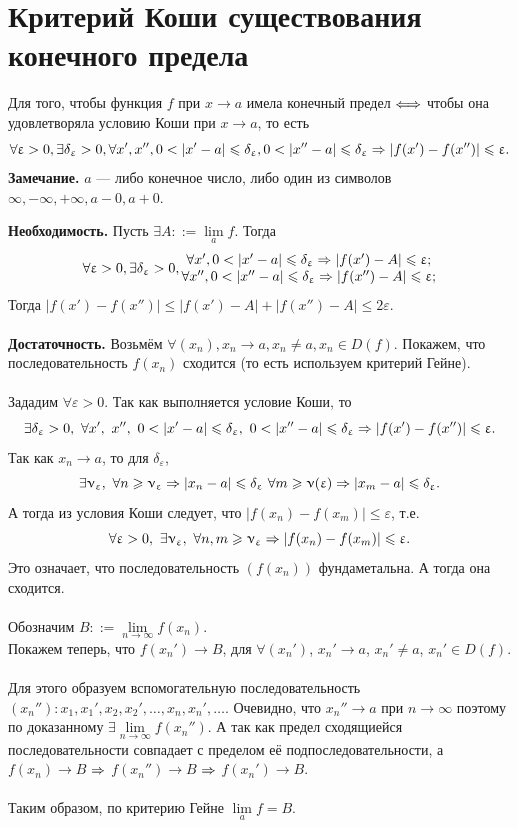 \section{Критерий Коши существования конечного предела}
\begin{theorem}
	Для того, чтобы функция $f$ при $x\to a$ имела конечный предел $\Longleftrightarrow$ чтобы она удовлетворяла условию Коши при $x\to a$, то есть
	$$\forall\varepsilon>0,\exists\delta_\varepsilon>0,\forall x', x'', 0<|x'-a|\leqslant\delta_\varepsilon, 0<|x''-a|\leqslant\delta_\varepsilon\Ra|f(x')-f(x'')|\leqslant\varepsilon.$$
	\textbf{Замечание.} $a$ --- либо конечное число, либо один из символов $\infty,-\infty,+\infty,a-0,a+0$.
\end{theorem}
\begin{Proof}\textbf{Необходимость.}
	Пусть $\exists A::=\lim\limits_a f$. Тогда\\$$\forall\varepsilon>0,\exists\delta_\varepsilon>0,\begin{matrix}
		\forall x',0<|x'-a|\leqslant\delta_\varepsilon\Ra|f(x')-A|\leqslant\varepsilon;\\
		\forall x'',0<|x''-a|\leqslant\delta_\varepsilon\Ra|f(x'')-A|\leqslant\varepsilon;
	\end{matrix}$$
	Тогда $|f(x')-f(x'')|\leqslant|f(x')-A|+|f(x'')-A|\leqslant2\varepsilon$.\\\\
	\textbf{Достаточность.}
	Возьмём $\forall(x_n),x_n\to a,x_n\neq a, x_n\in D(f)$.
	Покажем, что последовательность $f(x_n)$ сходится (то есть используем критерий Гейне).\\\\
	Зададим $\forall\varepsilon>0$. Так как выполняется условие Коши, то $$\exists\delta_\varepsilon>0,\ \forall x',\ x'',\ 0<|x'-a|\leqslant\delta_\varepsilon, \ 0<|x''-a|\leqslant\delta_\varepsilon\Ra |f(x')-f(x'')|\leqslant\varepsilon.$$
	Так как $x_n\to a$, то для $\delta_\varepsilon$, $$\exists\upnu_\upvarepsilon,\ \forall n\geqslant\upnu_\upvarepsilon\Rightarrow |x_n-a|\leqslant\delta_\upvarepsilon\ \forall m\geqslant\upnu(\upvarepsilon) \Rightarrow |x_m-a|\leqslant\delta_\upvarepsilon.$$ А тогда из условия Коши следует, что $|f(x_n)-f(x_m)|\leqslant\varepsilon$, т.е. $$\forall\varepsilon>0,\ \exists\nu_\varepsilon,\ \forall n,m\geqslant\nu_\varepsilon \Ra |f(x_n)-f(x_m)|\leqslant\varepsilon.$$	
	Это означает, что последовательность $(f(x_n))$ фундаметальна. А тогда она сходится.\\\\
	Обозначим $B::=\lim\limits_{n\to\infty}f(x_n)$.\\
	Покажем теперь, что $f(x_n')\to B$, для $\forall(x_n')$, $x_n'\to a$, $x_n'\neq a$, $x_n'\in D(f)$.\\\\
	Для этого образуем вспомогательную последовательность $(x_n''): x_1,x_1',x_2,x_2',\ldots,x_n,x_n',\ldots$. Очевидно, что $x_n''\to a$ при $n\to\infty$ поэтому по доказанному $\exists\lim\limits_{n\to\infty}f(x_n'')$. А так как предел сходящиейся последовательности совпадает с пределом её подпоследовательности, а
	$f(x_n)\to B$ $\Rightarrow$ $f(x_n'')\to B$ $\Rightarrow$ $f(x_n')\to B$.\\\\
	Таким образом, по критерию Гейне $\lim\limits_a f = B$.
\end{Proof}
